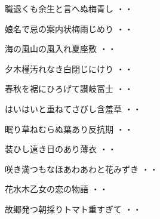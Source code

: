 \vspace{0.6cm}
\begin{shiika}職退くも余生と言へぬ梅青し
\hfill{・・}\end{shiika}
\vspace{0.6cm}
\begin{shiika}娘名で忌の案内状梅雨じめり
\hfill{・・}\end{shiika}
\vspace{0.6cm}
\begin{shiika}海の風山の風入れ夏座敷
\hfill{・・}\end{shiika}
\vspace{0.6cm}
\begin{shiika}夕木槿汚れなき白閉じにけり
\hfill{・・}\end{shiika}
\vspace{0.6cm}
\begin{shiika}春秋を裾にひろげて讃岐冨士
\hfill{・・}\end{shiika}
\vspace{0.6cm}
\begin{shiika}はいはいと重ねてさびし含羞草
\hfill{・・}\end{shiika}
\vspace{0.6cm}
\begin{shiika}眠り草ねむらぬ葉あり反抗期
\hfill{・・}\end{shiika}
\vspace{0.6cm}
\begin{shiika}装ひし遠き日のあり薄衣
\hfill{・・}\end{shiika}
\vspace{0.6cm}
\begin{shiika}咲き満つもなほあわあわと花みずき
\hfill{・・}\end{shiika}
\vspace{0.6cm}
\begin{shiika}花水木乙女の恋の物語
\hfill{・・}\end{shiika}
\vspace{0.6cm}
\begin{shiika}故郷発つ朝採りトマト重すぎて
\hfill{・・}\end{shiika}
